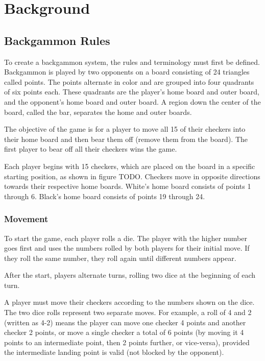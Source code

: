 
\chapter{Background}
\section{Backgammon Rules}
To create a backgammon system, the rules and terminology must first be defined.
Backgammon is played by two opponents on a board consisting of 24 triangles called points. 
The points alternate in color and are grouped into four quadrants of six points each. 
These quadrants are the player's home board and outer board, and the opponent's home board and outer board. 
A region down the center of the board, called the bar, separates the home and outer boards.

The objective of the game is for a player to move all 15 of their checkers into their home board and then bear them off (remove them from the board). 
The first player to bear off all their checkers wins the game.

Each player begins with 15 checkers, which are placed on the board in a specific starting position, as shown in figure TODO.
Checkers move in opposite directions towards their respective home boards. White's home board consists of points 1 through 6. Black's home board consists of points 19 through 24.

\subsection{Movement}
To start the game, each player rolls a die. 
The player with the higher number goes first and uses the numbers rolled by both players for their initial move. 
If they roll the same number, they roll again until different numbers appear.

After the start, players alternate turns, rolling two dice at the beginning of each turn.

A player must move their checkers according to the numbers shown on the dice. 
The two dice rolls represent two separate moves. 
For example, a roll of 4 and 2 (written as 4-2) means the player can move one checker 4 points and another checker 2 points, or move a single checker a total of 6 points (by moving it 4 points to an intermediate point, then 2 points further, or vice-versa), provided the intermediate landing point is valid (not blocked by the opponent).

